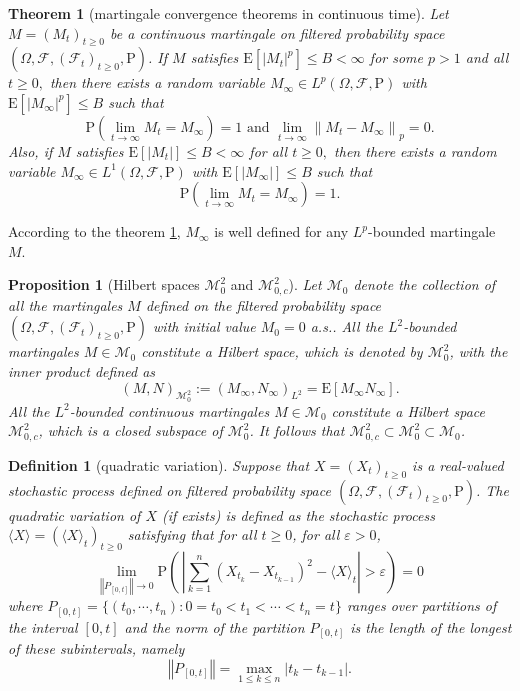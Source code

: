 \documentclass{article}
\newtheorem{definition}{Definition}[section]
\newtheorem{proposition}{Proposition}[section]
\newtheorem{theorem}{Theorem}[section]
\theoremstyle{nonumberplain}
\begin{document}
\begin{theorem}[martingale convergence theorems in continuous time]\label{martingale convergence}
Let $M=(M_{t})_{t\ge0}$ be a continuous martingale on filtered probability space $(\Omega,\mathcal{F},(\mathcal{F}_{t})_{t\ge0},\mathrm{P})$. If $M$ satisfies $\mathrm{E}\left[\left|M_{t}\right|^{p}\right] \leq B<\infty$ for some $p>1$ and all $t \geq 0,$ then there exists a random variable $M_{\infty}\in L^p(\Omega,\mathcal{F},\mathrm{P})$ with $\mathrm{E}\left[\left|M_{\infty}\right|^p\right] \leq B$ such that
\[
\mathrm{P}\left(\lim _{t \rightarrow \infty} M_{t}=M_{\infty}\right)=1 \text { and } \lim _{t \rightarrow \infty}\left\|M_{t}-M_{\infty}\right\|_{p}=0.
\]
Also, if $M$ satisfies $\mathrm{E}\left[\left|M_{t}\right|\right]\le B<\infty$ for all $t \ge 0,$ then there exists a random variable $M_{\infty}\in L^1(\Omega,\mathcal{F},\mathrm{P})$ with $\mathrm{E}\left[\left|M_{\infty}\right|\right] \leq B$ such that
\[
\mathrm{P}\left(\lim _{t \rightarrow \infty} M_{t}=M_{\infty}\right)=1.
\]
\end{theorem}
According to the theorem \ref{martingale convergence}, $M_{\infty}$ is well defined for any $L^p$-bounded martingale $M$. 

\begin{proposition}[Hilbert spaces $\mathscr{M}^2_0$ and $\mathscr{M}^2_{0,c}$]
Let $\mathscr{M}_0$ denote the collection of all the martingales $M$ defined on the filtered probability space $(\Omega,\mathcal{F},(\mathcal{F}_{t})_{t\ge0},\mathrm{P})$ with initial value $M_0=0$ a.s.. All the $L^2$-bounded martingales $M\in\mathscr{M}_0$ constitute a Hilbert space, which is denoted by $\mathscr{M}^2_{0}$, with the inner product defined as 
$$
 (M, N)_{\mathscr{M}^2_{0}}:=\left( M_{\infty}, N_{\infty}\right)_{L^{2}}=\mathrm{E}\left[M_{\infty} N_{\infty}\right].
$$
All the $L^2$-bounded continuous martingales $M\in\mathscr{M}_0$ constitute a Hilbert space $\mathscr{M}^2_{0,c}$, which is a closed subspace of $\mathscr{M}^2_{0}$. It follows that $\mathscr{M}^2_{0,c}\subset\mathscr{M}^2_{0}\subset\mathscr{M}_{0}$.
\end{proposition}

\begin{definition}[quadratic variation]	
	Suppose that $X=(X_t)_{t\ge 0}$ is a real-valued stochastic process defined on filtered probability space $(\Omega,\mathcal{F},(\mathcal{F}_{t})_{t\ge0},\mathrm{P})$. The \emph{quadratic variation} of $X$ (if exists) is defined as the stochastic process $\langle X\rangle=(\langle X\rangle_{t})_{t\ge0}$ satisfying that for all $t\ge0$, for all $\varepsilon>0$,
	\[
	\lim_{\left\Vert P_{[0,t]}\right\Vert \rightarrow 0}\mathrm{P}\left(\,\left|\sum _{k=1}^{n}(X_{t_{k}}-X_{t_{k-1}})^{2}-\langle X\rangle_{t}\right|>\varepsilon\right)=0
	\] 
	where $P_{[0,t]}=\{(t_0,\cdots,t_n):0=t_0<t_1<\cdots<t_n=t\}$ ranges over partitions of the interval $[0,t]$ and the norm of the partition $P_{[0,t]}$ is the length of the longest of these subintervals, namely
	\[
	\left\Vert P_{[0,t]}\right\Vert=\max\limits_{1\le k\le n}{|t_k-t_{k-1}|}.
	\]
\end{definition}
\end{document}
